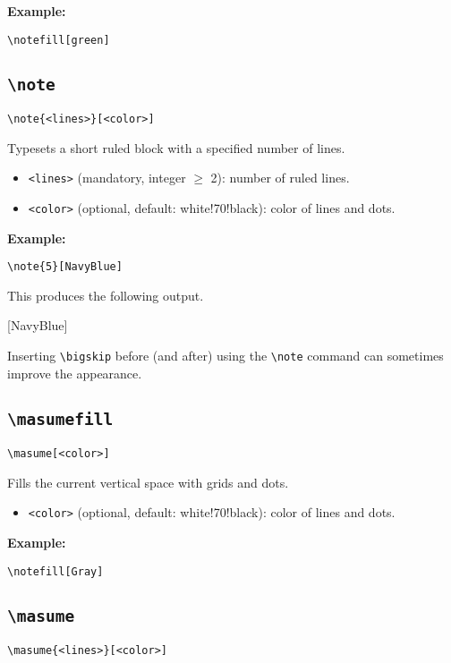 \documentclass[a4paper,12pt]{article}
\begin{document}
\textbf{Example:}
\begin{verbatim}
\notefill[green]
\end{verbatim}

\subsection{\texttt{\textbackslash note}}
\begin{verbatim}
\note{<lines>}[<color>]
\end{verbatim}

Typesets a short ruled block with a specified number of lines.

\begin{itemize}
    \item \texttt{<lines>} (mandatory, integer $\ge$ 2): number of ruled lines.
    \item \texttt{<color>} (optional, default: white!70!black): color of lines and dots.
\end{itemize}

\textbf{Example:}
\begin{verbatim}
\note{5}[NavyBlue]
\end{verbatim}

This produces the following output.\bigskip

[NavyBlue]

\bigskip Inserting \verb|\bigskip| before (and after) using the \verb|\note| command can sometimes improve the appearance.

\subsection{\texttt{\textbackslash masumefill}}
\begin{verbatim}
\masume[<color>]
\end{verbatim}

Fills the current vertical space with grids and dots.

\begin{itemize}
  \item \texttt{<color>} (optional, default: white!70!black): color of lines and dots.
\end{itemize}

\textbf{Example:}
\begin{verbatim}
\notefill[Gray]
\end{verbatim}

\subsection{\texttt{\textbackslash masume}}
\begin{verbatim}
\masume{<lines>}[<color>]
\end{verbatim}
\end{document}

